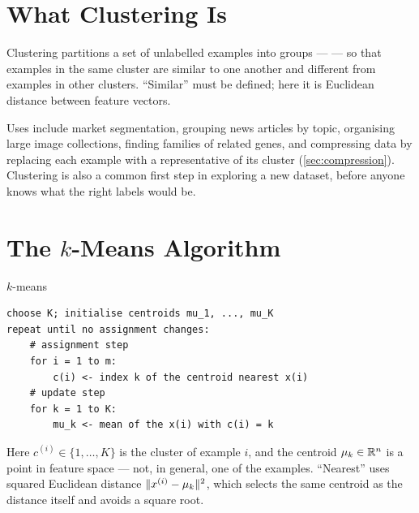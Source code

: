 \section{What Clustering Is}
\label{sec:clustering}

\begin{defbox}{Clustering}
 partitions a set of unlabelled examples into groups ---
 --- so that examples in the same cluster are similar to one
another and different from examples in other clusters. ``Similar'' must be
defined; here it is Euclidean distance between feature vectors.
\end{defbox}

Uses include market segmentation, grouping news articles by topic, organising
large image collections, finding families of related genes, and compressing data
by replacing each example with a representative of its cluster
(\cref{sec:compression}). Clustering is also a common first step in exploring a
new dataset, before anyone knows what the right labels would be.

\section{The \texorpdfstring{$k$}{k}-Means Algorithm}
\label{sec:kmeans-alg}

\begin{algorithmbox}{$k$-means}
\begin{lstlisting}[style=pseudocode]
choose K; initialise centroids mu_1, ..., mu_K
repeat until no assignment changes:
    # assignment step
    for i = 1 to m:
        c(i) <- index k of the centroid nearest x(i)
    # update step
    for k = 1 to K:
        mu_k <- mean of the x(i) with c(i) = k
\end{lstlisting}
Here $c^{(i)} \in \{1,\dots,K\}$ is the cluster of example $i$, and the
centroid $\mu_k \in \mathbb{R}^{n}$ is a point in feature space --- not, in general,
one of the examples. ``Nearest'' uses squared Euclidean distance
$\|x^{(i)} - \mu_k\|^2$, which selects the same centroid as the distance itself
and avoids a square root.
\end{algorithmbox}

